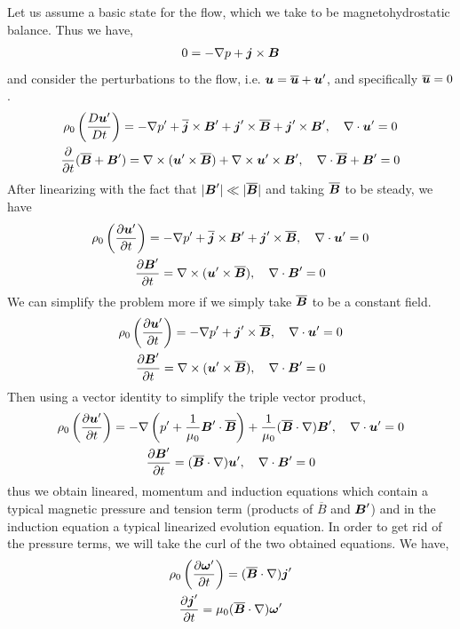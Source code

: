 \documentclass{article}
\begin{document}
Let us assume a basic state for the flow, which we take to be magnetohydrostatic
balance. Thus we have, 
\begin{gather*}
    0 = -\nabla p + \boldsymbol{j}\times\boldsymbol{B}
\end{gather*}
and consider the perturbations to the flow, i.e. $\boldsymbol{u} = \overline{\boldsymbol{u}} + \boldsymbol{u}'$,
and specifically $\overline{\boldsymbol{u}} = 0$.
\begin{gather*}
    \rho_0\left(\frac{D \boldsymbol{u}'}{D t}\right) = -\nabla p' +
    \overline{\boldsymbol{j}}\times\boldsymbol{B}' + \boldsymbol{j}'\times\overline{\boldsymbol{B}}+\boldsymbol{j}'\times\boldsymbol{B}', \quad \nabla \cdot{\boldsymbol{u}'}
    = 0\\
    \frac{\partial }{\partial t}(\overline{\boldsymbol{B}} + \boldsymbol{B}') = \nabla\times(\boldsymbol{u}'\times\overline{\boldsymbol{B}}) +
    \nabla\times\boldsymbol{u}'\times\boldsymbol{B}', \quad \nabla \cdot{\overline{\boldsymbol{B}} + \boldsymbol{B}'} = 0
\end{gather*}
After linearizing with the fact that $|\boldsymbol{B}'| \ll |\overline{\boldsymbol{B}}|$ and taking
$\overline{\boldsymbol{B}}$ to be steady, we have
\begin{gather*}
    \rho_0\left(\frac{\partial \boldsymbol{u}'}{\partial t} \right) = -\nabla p' +
    \overline{\boldsymbol{j}}\times\boldsymbol{B}' + \boldsymbol{j}'\times\overline{\boldsymbol{B}}, \quad \nabla \cdot{\boldsymbol{u}'}
    = 0\\
    \frac{\partial \boldsymbol{B}'}{\partial t} = \nabla\times(\boldsymbol{u}'\times\overline{\boldsymbol{B}}), \quad \nabla \cdot{\boldsymbol{B}'} = 0
\end{gather*}
We can simplify the problem more if we simply take $\overline{\boldsymbol{B}}$ to be a constant
field. 
\begin{gather*}
    \rho_0\left(\frac{\partial \boldsymbol{u}'}{\partial t} \right) = -\nabla p' +
    \boldsymbol{j}'\times\overline{\boldsymbol{B}}, \quad \nabla \cdot{\boldsymbol{u}'}
    = 0\\
    \frac{\partial \boldsymbol{B}'}{\partial t} = \nabla\times(\boldsymbol{u}'\times\overline{\boldsymbol{B}}), \quad \nabla \cdot{\boldsymbol{B}'} = 0
\end{gather*}
Then using a vector identity to simplify the triple vector product, 
\begin{gather*}
    \rho_0\left(\frac{\partial \boldsymbol{u}'}{\partial t} \right) = -\nabla \left(p' +
    \frac{1}{\mu_0}\boldsymbol{B}'\cdot\overline{\boldsymbol{B}}\right) + \frac{1}{\mu_0}(\overline{\boldsymbol{B}}\cdot\nabla)\boldsymbol{B}', \quad \nabla \cdot{\boldsymbol{u}'}
    = 0\\
    \frac{\partial \boldsymbol{B}'}{\partial t} = (\overline{\boldsymbol{B}}\cdot\nabla)\boldsymbol{u}', \quad \nabla \cdot{\boldsymbol{B}'} = 0
\end{gather*}
thus we obtain lineared, momentum and induction equations which contain a
typical magnetic pressure and tension term (products of $\overline{B}$ and $\boldsymbol{B}'$) and
in the induction equation a typical linearized evolution equation. In order to
get rid of the pressure terms, we will take the curl of the two obtained
equations. We have, 
\begin{gather*}
    \rho_0\left(\frac{\partial \boldsymbol{\omega}'}{\partial t} \right) = (\overline{\boldsymbol{B}}\cdot\nabla)\boldsymbol{j}' \\
    \frac{\partial \boldsymbol{j}'}{\partial t} = \mu_0(\overline{\boldsymbol{B}}\cdot\nabla)\boldsymbol{\omega}'
\end{gather*}
\end{document}

